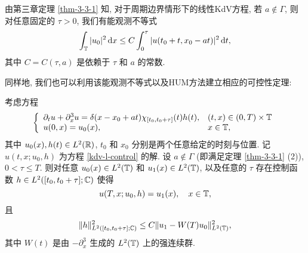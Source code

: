由第三章定理 \ref{thm-3-3-1} 知, 对于周期边界情形下的线性KdV方程, 若 $a\notin \Gamma$, 则对任意固定的 $\tau>0$, 我们有能观测不等式 
 \begin{equation}
     \int_{\mathbb{T}}|u_0|^2\,\mathrm{d} x\le C\int_{0}^\tau |u(t_0+t,x_0-at)|^2\,\mathrm{d} t,\label{holyshit}
 \end{equation}
 其中 $C=C(\tau, a)$ 是依赖于 $\tau$ 和 $a$ 的常数.
 
同样地, 我们也可以利用该能观测不等式以及HUM方法建立相应的可控性定理:
\begin{theorem}
 考虑方程
 \begin{equation}
     \left\lbrace\begin{array}{ll}
         \partial_t u+\partial_x^3u=\delta (x-x_0+at) \chi_{[t_0,t_0+\tau]}(t) h(t), & (t,x)\in (0,T)\times \mathbb{T}\\
         u(0,x)=u_0(x), & x\in \mathbb{T},
     \end{array}\right.\label{kdv-l-control}
 \end{equation}
 其中 $u_0(x),h(t)\in L^2(\mathbb{R})$, $t_0$ 和 $x_0$ 分别是两个任意给定的时刻与位置. 记 $u(t,x;u_0,h)$ 为方程 \eqref{kdv-l-control} 的解. 设 $a\notin \Gamma$ {{\rm{(}}即满足定理 \rm{\ref{thm-3-3-1} (2))}}, $0<\tau\le T$. 则对任意 $u_0(x)\in L^2(\mathbb{T})$ 和 $u_1(x)\in L^2(\mathbb{T})$, 以及任意的 $\tau$ 存在控制函数 $h\in L^2([t_0,t_0+\tau];\mathbb{C})$ 使得 
 \begin{equation}
     u(T,x;u_0,h)=u_1(x),\quad x\in \mathbb{T},
 \end{equation}
 且 
 \begin{equation}
     \|h\|^2_{L^2([t_0,t_0+\tau];\mathbb{C})}\le C\| u_1-W(T)u_0\|^2_{L^2(\mathbb{T})},
 \end{equation} 其中 $W(t) $ 是由 $-\partial_x^3$ 生成的 $L^2(\mathbb{T})$ 上的强连续群.
\end{theorem}

